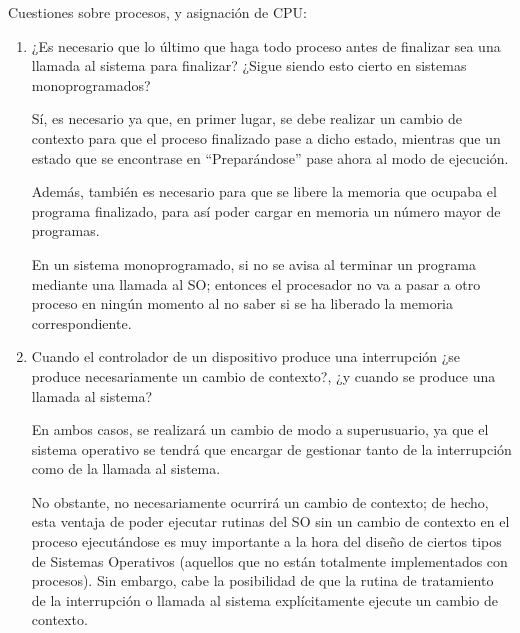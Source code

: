 \begin{ejercicio}\label{ej:2.Ejercicio9}
    Cuestiones sobre procesos, y asignación de CPU:
    \begin{enumerate}
        \item ¿Es necesario que lo último que haga todo proceso antes de finalizar sea una llamada al sistema para finalizar? ¿Sigue siendo esto cierto en sistemas monoprogramados?

        Sí, es necesario ya que, en primer lugar, se debe realizar un cambio de contexto para que el proceso finalizado pase a dicho estado, mientras que un estado que se encontrase en ``Preparándose'' pase ahora al modo de ejecución.

        Además, también es necesario para que se libere la memoria que ocupaba el programa finalizado, para así poder cargar en memoria un número mayor de programas.

        En un sistema monoprogramado, si no se avisa al terminar un programa mediante una llamada al SO; entonces el procesador no va a pasar a otro proceso en ningún momento al no saber si se ha liberado la memoria correspondiente.
    

        \item Cuando el controlador de un dispositivo produce una interrupción ¿se produce necesariamente un cambio de contexto?, ¿y cuando se produce una llamada al sistema?

        En ambos casos, se realizará un cambio de modo a superusuario, ya que el sistema operativo se tendrá que encargar de gestionar tanto de la interrupción como de la llamada al sistema.

        No obstante, no necesariamente ocurrirá un cambio de contexto; de hecho, esta ventaja de poder ejecutar rutinas del SO sin un cambio de contexto en el proceso ejecutándose es muy importante a la hora del diseño de ciertos tipos de Sistemas Operativos (aquellos que no están totalmente implementados con procesos). 
        Sin embargo, cabe la posibilidad de que la rutina de tratamiento de la interrupción o llamada al sistema explícitamente ejecute un cambio de contexto.
        
        \begin{comment}
        Sí, cuando se produce una interrupción debe efectuarse un cambio de contexto, ya que el sistema operativo pasa a ejecutar una subrutina para gestionar la interrupción, y para eso se requiere un cambio de contexto (Dispatcher). En el caso de una llamada al sistema también debe efectuarse un cambio de contexto, ya que el programa que hace la llamada interrumpe su ejecución para que el sistema operativo ejecute la rutina que realice la tarea solicitada en la llamada, y este salto entre procesos requiere un cambio de contexto.
        \end{comment}


\end{enumerate}
\end{ejercicio}
